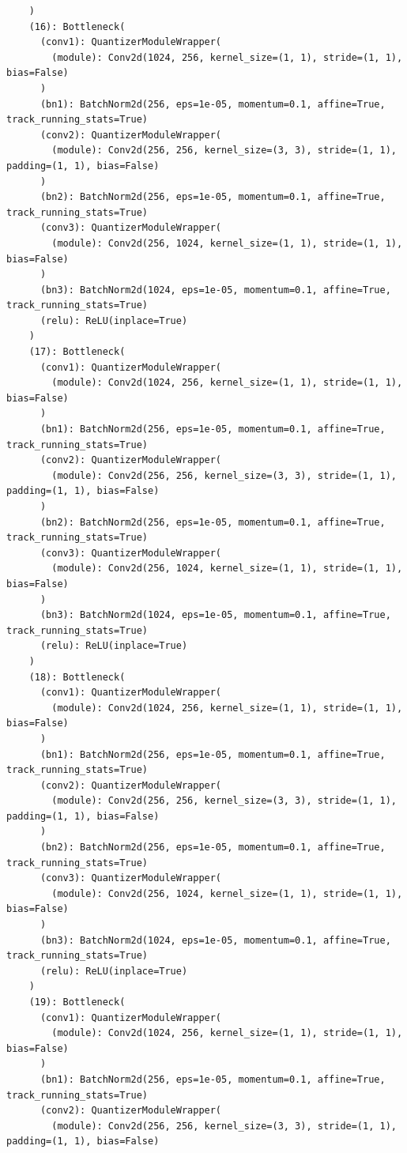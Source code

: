 \documentclass{article}
\begin{document}
\begin{verbatim}
    )
    (16): Bottleneck(
      (conv1): QuantizerModuleWrapper(
        (module): Conv2d(1024, 256, kernel_size=(1, 1), stride=(1, 1), bias=False)
      )
      (bn1): BatchNorm2d(256, eps=1e-05, momentum=0.1, affine=True, track_running_stats=True)
      (conv2): QuantizerModuleWrapper(
        (module): Conv2d(256, 256, kernel_size=(3, 3), stride=(1, 1), padding=(1, 1), bias=False)
      )
      (bn2): BatchNorm2d(256, eps=1e-05, momentum=0.1, affine=True, track_running_stats=True)
      (conv3): QuantizerModuleWrapper(
        (module): Conv2d(256, 1024, kernel_size=(1, 1), stride=(1, 1), bias=False)
      )
      (bn3): BatchNorm2d(1024, eps=1e-05, momentum=0.1, affine=True, track_running_stats=True)
      (relu): ReLU(inplace=True)
    )
    (17): Bottleneck(
      (conv1): QuantizerModuleWrapper(
        (module): Conv2d(1024, 256, kernel_size=(1, 1), stride=(1, 1), bias=False)
      )
      (bn1): BatchNorm2d(256, eps=1e-05, momentum=0.1, affine=True, track_running_stats=True)
      (conv2): QuantizerModuleWrapper(
        (module): Conv2d(256, 256, kernel_size=(3, 3), stride=(1, 1), padding=(1, 1), bias=False)
      )
      (bn2): BatchNorm2d(256, eps=1e-05, momentum=0.1, affine=True, track_running_stats=True)
      (conv3): QuantizerModuleWrapper(
        (module): Conv2d(256, 1024, kernel_size=(1, 1), stride=(1, 1), bias=False)
      )
      (bn3): BatchNorm2d(1024, eps=1e-05, momentum=0.1, affine=True, track_running_stats=True)
      (relu): ReLU(inplace=True)
    )
    (18): Bottleneck(
      (conv1): QuantizerModuleWrapper(
        (module): Conv2d(1024, 256, kernel_size=(1, 1), stride=(1, 1), bias=False)
      )
      (bn1): BatchNorm2d(256, eps=1e-05, momentum=0.1, affine=True, track_running_stats=True)
      (conv2): QuantizerModuleWrapper(
        (module): Conv2d(256, 256, kernel_size=(3, 3), stride=(1, 1), padding=(1, 1), bias=False)
      )
      (bn2): BatchNorm2d(256, eps=1e-05, momentum=0.1, affine=True, track_running_stats=True)
      (conv3): QuantizerModuleWrapper(
        (module): Conv2d(256, 1024, kernel_size=(1, 1), stride=(1, 1), bias=False)
      )
      (bn3): BatchNorm2d(1024, eps=1e-05, momentum=0.1, affine=True, track_running_stats=True)
      (relu): ReLU(inplace=True)
    )
    (19): Bottleneck(
      (conv1): QuantizerModuleWrapper(
        (module): Conv2d(1024, 256, kernel_size=(1, 1), stride=(1, 1), bias=False)
      )
      (bn1): BatchNorm2d(256, eps=1e-05, momentum=0.1, affine=True, track_running_stats=True)
      (conv2): QuantizerModuleWrapper(
        (module): Conv2d(256, 256, kernel_size=(3, 3), stride=(1, 1), padding=(1, 1), bias=False)

\end{verbatim}
\end{document}
